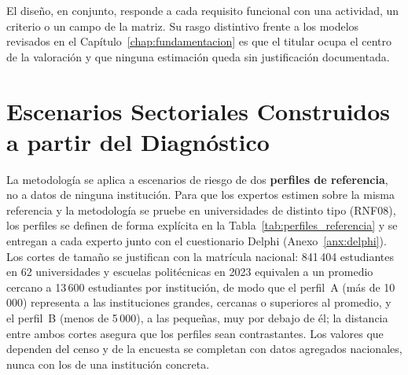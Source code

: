 El diseño, en conjunto, responde a cada requisito funcional con una actividad, un criterio o un campo de la matriz. Su rasgo distintivo frente a los modelos revisados en el Capítulo~\ref{chap:fundamentacion} es que el titular ocupa el centro de la valoración y que ninguna estimación queda sin justificación documentada.


\section{Escenarios Sectoriales Construidos a partir del Diagnóstico}
\label{sec:escenarios_sectoriales}

La metodología se aplica a escenarios de riesgo de dos \textbf{perfiles de referencia}, no a datos de ninguna institución. Para que los expertos estimen sobre la misma referencia y la metodología se pruebe en universidades de distinto tipo (RNF08), los perfiles se definen de forma explícita en la Tabla~\ref{tab:perfiles_referencia} y se entregan a cada experto junto con el cuestionario Delphi (Anexo~\ref{anx:delphi}). Los cortes de tamaño se justifican con la matrícula nacional: 841\,404 estudiantes en 62 universidades y escuelas politécnicas en 2023 \cite{sumba2025economia} equivalen a un promedio cercano a 13\,600 estudiantes por institución, de modo que el perfil~A (más de 10\,000) representa a las instituciones grandes, cercanas o superiores al promedio, y el perfil~B (menos de 5\,000), a las pequeñas, muy por debajo de él; la distancia entre ambos cortes asegura que los perfiles sean contrastantes. Los valores que dependen del censo y de la encuesta se completan con datos agregados nacionales, nunca con los de una institución concreta.

